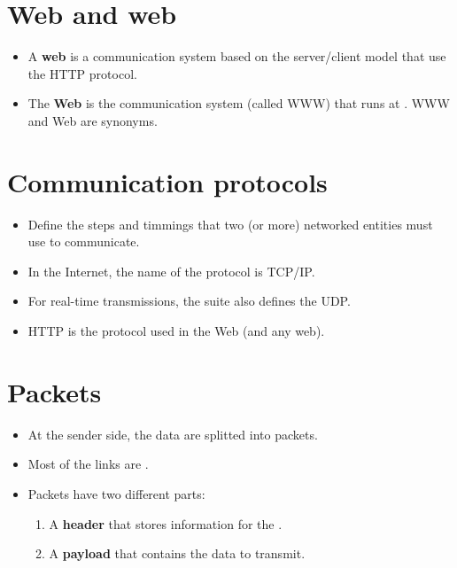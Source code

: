 \section{Web and web}
\begin{itemize}
\item A \textbf{web} is a communication system based on the
server/client model that use the \gls{HTTP} protocol.
\item The \textbf{Web} is the communication system (called \gls{WWW})
that runs at . \gls{WWW} and Web are synonyms.
\end{itemize}

\section{Communication protocols}
\begin{itemize}
\item Define the steps and timmings that two (or more) networked
entities must use to communicate.
\item In the Internet, the name of the protocol  is \acrshort{TCP}/\acrshort{IP}.
\item For real-time transmissions, the suite also defines the
\gls{UDP}.
\item \gls{HTTP} is the protocol used in the Web (and any web).
\end{itemize}

\section{Packets}
\begin{itemize}
\item At the sender side, the data are splitted into packets.
\item Most of the links are .
\item Packets have two different parts:
\begin{enumerate}
\item A \textbf{header} that stores information for the .
\item A \textbf{payload} that contains the data to transmit.
\end{enumerate}
\end{itemize}